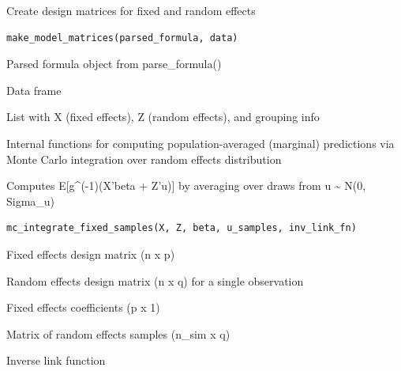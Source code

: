 \documentclass[a4paper]{book}
\begin{document}
%
\begin{Description}
Create design matrices for fixed and random effects
\end{Description}
%
\begin{Usage}
\begin{verbatim}
make_model_matrices(parsed_formula, data)
\end{verbatim}
\end{Usage}
%
\begin{Arguments}
\begin{ldescription}
\item[\code{parsed\_formula}] Parsed formula object from parse\_formula()

\item[\code{data}] Data frame
\end{ldescription}
\end{Arguments}
%
\begin{Value}
List with X (fixed effects), Z (random effects), and grouping info
\end{Value}
%
\begin{Description}
Internal functions for computing population-averaged (marginal) predictions
via Monte Carlo integration over random effects distribution
\end{Description}
%
\begin{Description}
Computes E[g\textasciicircum{}(-1)(X'beta + Z'u)] by averaging over draws from u \textasciitilde{} N(0, Sigma\_u)
\end{Description}
%
\begin{Usage}
\begin{verbatim}
mc_integrate_fixed_samples(X, Z, beta, u_samples, inv_link_fn)
\end{verbatim}
\end{Usage}
%
\begin{Arguments}
\begin{ldescription}
\item[\code{X}] Fixed effects design matrix (n x p)

\item[\code{Z}] Random effects design matrix (n x q) for a single observation

\item[\code{beta}] Fixed effects coefficients (p x 1)

\item[\code{u\_samples}] Matrix of random effects samples (n\_sim x q)

\item[\code{inv\_link\_fn}] Inverse link function
\end{ldescription}
\end{Arguments}
\end{document}
